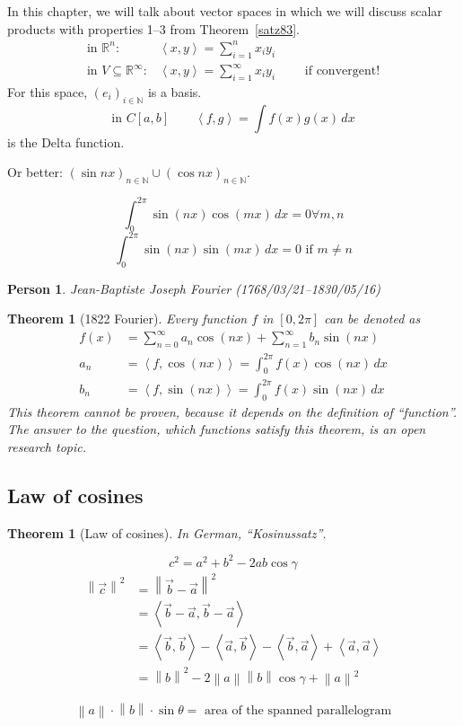 \documentclass[a4paper]{article}
\newcounter{lecref}[section]
\numberwithin{lecref}{section}
\newtheorem{theorem}[lecref]{Theorem}
\newtheorem*{Person}{Person}
\newcommand{\angel}[1]{\left\langle#1\right\rangle}
\newcommand{\norm}[1]{\left\|#1\right\|}
\newcommand{\rh}[1]{\vec{#1}}
\begin{document}
In this chapter, we will talk about vector spaces in which we will discuss scalar products with properties 1--3 from Theorem~\ref{satz83}.
\begin{align*}
  \text{in } \mathbb R^n: &\angel{x,y} = \sum_{i=1}^n x_i y_i \\
  \text{in } V \subseteq \mathbb R^\infty: &\angel{x,y} = \sum_{i=1}^\infty x_i y_i \qquad \text{ if convergent!}
\end{align*}
For this space, $(e_i)_{i \in \mathbb N}$ is a basis.
\[ \text{in } C[a,b] \qquad \angel{f,g} = \int f(x) g(x) \, dx \]
is the Delta function.

Or better: $(\sin{nx})_{n \in \mathbb N} \cup (\cos{nx})_{n \in \mathbb N}$.

\[ \int_0^{2\pi} \sin(nx) \cos(mx) \, dx = 0 \forall m,n \]
\[ \int_0^{2\pi} \sin(nx) \sin(mx) \, dx = 0 \text{ if } m \neq n \]

\begin{Person}
  Jean-Baptiste Joseph Fourier (1768/03/21--1830/05/16)
\end{Person}

\begin{theorem}[1822 Fourier]
  Every function $f$ in $[0,2\pi]$ can be denoted as
  \begin{align*}
    f(x) &= \sum_{n=0}^\infty a_n \cos(nx) + \sum_{n=1}^\infty b_n \sin(nx) \\
    a_n &= \angel{f, \cos(nx)} = \int_0^{2\pi} f(x) \cos(nx) \, dx \\
    b_n &= \angel{f, \sin(nx)} = \int_0^{2\pi} f(x) \sin(nx) \, dx
  \end{align*}
  This theorem cannot be proven, because it depends on the definition of \enquote{function}.
  The answer to the question, which functions satisfy this theorem, is an open research topic.
\end{theorem}

\subsection{Law of cosines}

\begin{theorem}[Law of cosines]
  In German, \foreignlanguage{german}{\enquote{Kosinussatz}}.

  \[ c^2 = a^2 + b^2 - 2ab \cos{\gamma} \]
  \begin{align*}
    \norm{\rh{c}}^2 &= \norm{\rh{b} - \rh{a}}^2 \\
      &= \angel{\rh{b} - \rh{a}, \rh{b} - \rh{a}} \\
      &= \angel{\rh{b}, \rh{b}} - \angel{\rh{a}, \rh{b}} - \angel{\rh{b}, \rh{a}} + \angel{\rh{a}, \rh{a}} \\
      &= \norm{b}^2 - 2 \norm{a} \norm{b} \cos\gamma + \norm{a}^2
  \end{align*}
\end{theorem}
\[ \norm a \cdot \norm b \cdot \sin\theta = \text{ area of the spanned parallelogram} \]
\end{document}
